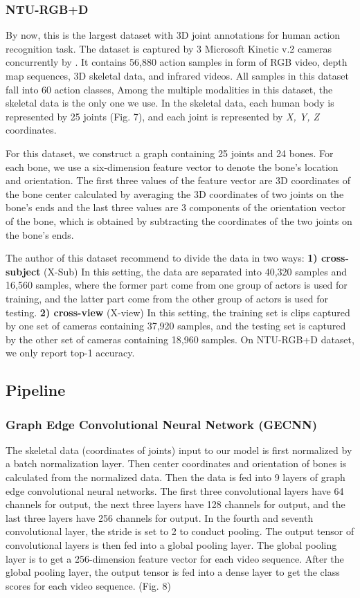 \documentclass[a4paper,11pt]{article}
\begin{document}
\subsubsection{NTU-RGB+D}
By now, this is the largest dataset with 3D joint annotations for human action recognition task. The dataset is captured by 3 Microsoft Kinetic v.2 cameras concurrently by \cite{shahroudy2016ntu}. It contains 56,880 action samples in form of RGB video, depth map sequences, 3D skeletal data, and infrared videos. All samples in this dataset fall into 60 action classes, Among the multiple modalities in this dataset, the skeletal data is the only one we use. In the skeletal data, each human body is represented by 25 joints (Fig. 7), and each joint is represented by {\it X, Y, Z} coordinates.




For this dataset, we construct a graph containing 25 joints and 24 bones. For each bone, we use a six-dimension feature vector to denote the bone's location and orientation. The first three values of the feature vector are 3D coordinates of the bone center calculated by averaging the 3D coordinates of two joints on the bone's ends and the last three values are 3 components of the orientation vector of the bone, which is obtained by subtracting the coordinates of the two joints on the bone's ends.

The author of this dataset recommend to divide the data in two ways:
{\bf 1) cross-subject} (X-Sub)
In this setting, the data are separated into 40,320 samples and 16,560 samples, where the former part come from one group of actors is used for training, and the latter part come from the other group of actors is used for testing.
{\bf 2) cross-view} (X-view) In this setting, the training set is clips captured by one set of cameras containing 37,920 samples, and the testing set is captured by the other set of cameras containing 18,960 samples.
On NTU-RGB+D dataset, we only report top-1 accuracy.


\subsection{Pipeline}
\subsubsection{Graph Edge Convolutional Neural Network (GECNN)}
The skeletal data (coordinates of joints) input to our model is first normalized by a batch normalization layer. Then center coordinates and orientation of bones is calculated from the normalized data. Then the data is fed into 9 layers of graph edge convolutional neural networks. The first three convolutional layers have 64 channels for output, the next three layers have 128 channels for output, and the last three layers have 256 channels for output. In the fourth and seventh convolutional layer, the stride is set to 2 to conduct pooling. The output tensor of convolutional layers is then fed into a global pooling layer. The global pooling layer is to get a 256-dimension feature vector for each video sequence. After the global pooling layer, the output tensor is fed into a dense layer to get the class scores for each video sequence. (Fig. 8)
\end{document}
